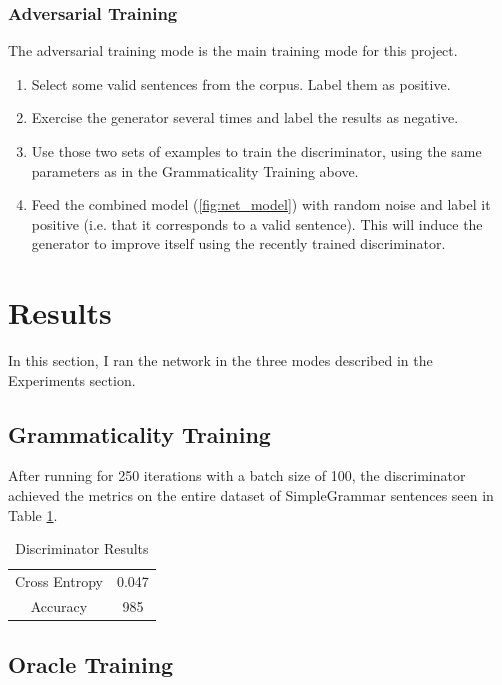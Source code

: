 \documentclass[11pt]{article}
\begin{document}
\subsubsection{Adversarial Training}

The adversarial training mode is the main training mode for this project.

\begin{enumerate}
    \item Select some valid sentences from the corpus. Label them as positive.
    \item Exercise the generator several times and label the results as negative.
    \item Use those two sets of examples to train the discriminator, using the same parameters as in the Grammaticality Training above.
    \item Feed the combined model (\ref{fig:net_model}) with random noise and label it positive (i.e. that it corresponds to a valid sentence). This will induce the generator to improve itself using the recently trained discriminator.
\end{enumerate}

\section{Results}

In this section, I ran the network in the three modes described in the Experiments section.

\subsection{Grammaticality Training}

After running for 250 iterations with a batch size of 100, the discriminator achieved the metrics on the entire dataset of SimpleGrammar sentences seen in Table \ref{tab:disc_results}.

\begin{table}[ht]
    \centering
    \begin{tabular}{c|c}
        \hline
        Cross Entropy & 0.047 \\
        Accuracy & 985 \\
    \end{tabular}
    \caption{Discriminator Results}
    \label{tab:disc_results}
\end{table}

\subsection{Oracle Training}
\end{document}
